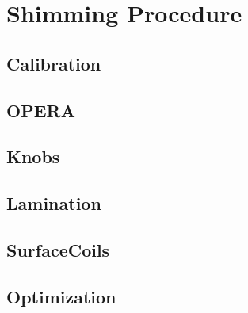 \section{Shimming Procedure}
\label{sec:Shimming-Procedure}
\subsection{Calibration}
\subsection{OPERA}
\subsection{Knobs}
\subsection{Lamination}
\subsection{SurfaceCoils}
\subsection{Optimization}



